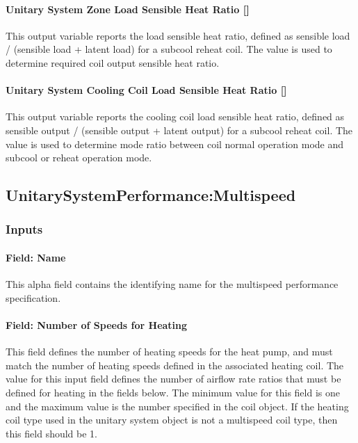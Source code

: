 \paragraph{Unitary System Zone Load Sensible Heat Ratio {[]}}\label{unitary-system-zone-load-sensible-heat-ratio}

This output variable reports the load sensible heat ratio, defined as sensible load / (sensible load + latent load) for a subcool reheat coil. The value is used to determine required coil output sensible heat ratio.

\paragraph{Unitary System Cooling Coil Load Sensible Heat Ratio {[]}}\label{unitary-system-cooling-coil-load-sensible-heat-ratio}

This output variable reports the cooling coil load sensible heat ratio, defined as sensible output / (sensible output + latent output) for a subcool reheat coil. The value is used to determine mode ratio between coil normal operation mode and subcool or reheat operation mode.

\subsection{UnitarySystemPerformance:Multispeed}\label{unitarysystemperformancemultispeed}

\subsubsection{Inputs}\label{inputs-1-046}

\paragraph{Field: Name}\label{field-name-1-045}

This alpha field contains the identifying name for the multispeed performance specification.

\paragraph{Field: Number of Speeds for Heating}\label{field-number-of-speeds-for-heating}

This field defines the number of heating speeds for the heat pump, and must match the number of heating speeds defined in the associated heating coil. The value for this input field defines the number of airflow rate ratios that must be defined for heating in the fields below. The minimum value for this field is one and the maximum value is the number specified in the coil object. If the heating coil type used in the unitary system object is not a multispeed coil type, then this field should be 1.

